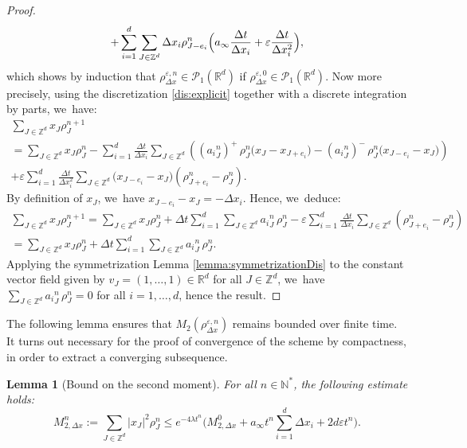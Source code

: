\documentclass[11pt]{article}
\numberwithin{equation}{section}
\def\NN{\mathbb{N}}
\def\RR{\mathbb{R}}
\def\ZZ{\mathbb{Z}}
\def\eps{\varepsilon}
\def\dt{\Delta t}
\def\dx{\Delta x}
\theoremstyle{plain}
\newtheorem{lemma}[theorem]{Lemma}
\theoremstyle{definition}
\begin{document}
\begin{proof}
\begin{multline*}
+ \sum_{i = 1}^d \sum_{J\in \ZZ^d} \Delta x_i\rho_{J - e_i}^{n} \Bigl(a_\infty \frac{\Delta t}{\Delta x_i} + \eps \frac{\Delta t}{\Delta x_i^2}\Bigr),
\end{multline*}
which shows by induction that $\rho_{\Delta x}^{\eps,n} \in \mathcal{P}_1(\RR^d)$ if $\rho_{\Delta x}^{\eps,0} \in \mathcal{P}_1(\RR^d)$.
Now more precisely, using the discretization \eqref{dis:explicit} together with a discrete integration by parts, we~have:\vspace*{-5pt}
\begin{multline*}
\sum_{J\in \ZZ^d} x_J\rho_{J}^{n+1} \\[-3pt]
= \sum_{J\in
\ZZ^d} x_J\rho_{J}^n 
- \sum_{i=1}^d\frac{\dt}{\dx_i} \sum_{J\in
\ZZ^d} \left(({a_i}^n_{J})^+ \, \rho_{J}^n \big(x_J-x_{J+e_i}\big)
-({a_i}^n_{J})^- \, \rho_{J}^n \big(x_{J-e_i}-x_J\big) \right) \\[-3pt]
+ \eps\sum_{i=1}^d\frac{\dt}{\dx_i^2} \sum_{J\in
\ZZ^d} \big(x_{J-e_i}-x_J\big)(\rho_{J+e_i}^n - \rho_{J}^n).
\end{multline*}
By definition of $x_J$, we~have $x_{J-e_i}-x_J = -\dx_i$. Hence, we~deduce:\vspace*{-5pt}
\begin{multline*}
\sum_{J\in \ZZ^d} x_J\rho_{J}^{n+1} = \sum_{J\in \ZZ^d}
x_J\rho_{J}^n + \dt \sum_{i=1}^d \sum_{J\in \ZZ^d} {a_i}^n_{J} \, \rho_{J}^n - \eps\sum_{i=1}^d\frac{\dt}{\dx_i} \sum_{J\in
\ZZ^d}(\rho_{J+e_i}^n - \rho_{J}^n) \\[-3pt]
= \sum_{J\in \ZZ^d}
x_J\rho_{J}^n + \dt \sum_{i=1}^d \sum_{J\in \ZZ^d} {a_i}^n_{J} \, \rho_{J}^n.
\end{multline*}
Applying the symmetrization Lemma \ref{lemma:symmetrizationDis} to the constant vector field given by $v_J = (1, \ldots, 1) \in \RR^d$ for all $J \in \ZZ^d$, we~have $\sum_{J\in \ZZ^d} {a_i}^n_{J} \, \rho_{J}^n = 0$ for all $i=1,\ldots,d$, hence the result.
\end{proof}
The following lemma ensures that $M_2(\rho_{\dx}^{\eps,n})$ remains bounded over finite time. It turns out necessary for the proof of convergence of the scheme by compactness, in order to extract a converging subsequence.
\begin{lemma}[Bound on the second moment]\label{bounddismom}
For all $n\in \NN^*$, the following estimate holds:\vspace*{-3pt}
\begin{equation*}
M_{2,\dx}^n := \sum_{J\in \ZZ^d} |x_J|^2\rho_{J}^n \leq e^{-4 \lambda t^n} \Big(M_{2,\dx}^0 + a_\infty t^n \sum_{i=1}^d \dx_i + 2d\eps t^n\Big).
\end{equation*}
\end{lemma}
\end{document}
